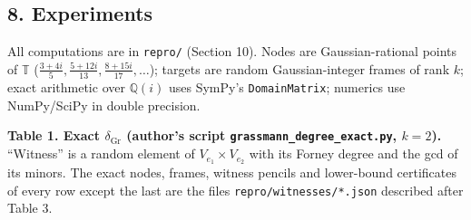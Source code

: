 \documentclass[
  11pt,
  a4paper,
]{article}
\begin{document}
\subsection{8. Experiments}\label{experiments}

All computations are in {\small\texttt{repro/\allowbreak{}}} (Section 10). Nodes are
Gaussian-rational points of \(\mathbb T\)
(\(\tfrac{3+4i}5,\allowbreak{}\tfrac{5+12i}{13},\allowbreak{}\tfrac{8+15i}{17},\allowbreak{}\dots\)); targets
are random Gaussian-integer frames of rank \(k\); exact arithmetic over
\(\mathbb Q(i)\) uses SymPy's {\small\texttt{DomainMatrix}}; numerics use
NumPy/SciPy in double precision.

\textbf{Table 1. Exact \(\delta_{\mathrm{Gr}}\) (author's script
{\small\texttt{grassmann\_\allowbreak{}degree\_\allowbreak{}exact.\allowbreak{}py}}, \(k=2\)).} ``Witness'' is a random
element of \(V_{e_1}\times V_{e_2}\) with its Forney degree and the gcd
of its minors. The exact nodes, frames, witness pencils and lower-bound
certificates of every row except the last are the files
{\small\texttt{repro/\allowbreak{}witnesses/\allowbreak{}*.\allowbreak{}json}} described after Table 3.
\end{document}
